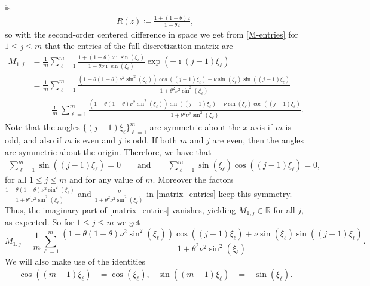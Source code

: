 \documentclass[smallextended,numbook,runningheads]{svjour3}     %
\begin{document}
is
\begin{align}\label{R}
    R(z)  \coloneqq \frac{1+(1-\theta)z}{1-\theta z},
\end{align}
so with the second-order centered difference in space we get from \eqref{M-entries} for $1\le j\le m$ that
the entries of the full discretization matrix are 
\begin{equation}\label{matrix_entries}
\begin{split}
	M_{1,j} &= \frac{1}{m} \sum_{\ell=1}^m \frac{1+(1-\theta)\nu \imath\sin(\xi_\ell)}
		{1-\theta\nu \imath\sin(\xi_\ell)}\exp\left(-\imath(j-1)\xi_\ell\right) \\
		&= \frac{1}{m} \sum_{\ell=1}^{m} \frac{\left(1-\theta(1-\theta)\nu^2\sin^2(\xi_\ell)\right)
		\cos((j-1)\xi_\ell) + \nu \sin(\xi_\ell)\sin((j-1)\xi_\ell)}{1+\theta^2\nu^2 \sin^2(\xi_\ell)} \\
		&\quad - \frac{\imath}{m} \sum_{\ell=1}^{m} \frac{\left(1-\theta(1-\theta)\nu^2\sin^2(\xi_\ell)
		\right)\sin((j-1)\xi_\ell) - \nu \sin(\xi_\ell)\cos((j-1)\xi_\ell)}
		{1+\theta^2\nu^2 \sin^2(\xi_\ell)}.
\end{split}
\end{equation}
Note that the angles $\{(j-1)\xi_\ell\}_{\ell=1}^m$ are symmetric about the $x$-axis if $m$ is odd, and
also if $m$ is even and $j$ is odd.
If both $m$ and $j$ are even, then the angles are symmetric about the origin.
Therefore, we have that
\begin{align*}
	\sum_{\ell=1}^{m} \sin((j-1)\xi_\ell) = 0 \qquad \text{and} \qquad
		\sum_{\ell=1}^{m} \sin(\xi_\ell)\cos((j-1)\xi_\ell) = 0,
\end{align*}
for all $1\le j\le m$  and for any value of $m$.
Moreover the factors
$\frac{1-\theta(1-\theta)\nu^2\sin^2(\xi_\ell)}{1+\theta^2\nu^2 \sin^2(\xi_\ell)}$
and $\frac{\nu}{1+\theta^2\nu^2 \sin^2(\xi_\ell)}$ in \eqref{matrix_entries} keep this symmetry.
Thus, the imaginary part of \eqref{matrix_entries} vanishes, yielding $M_{1,j}\in\mathbb{R}$ for all $j$,
as expected.
So for $1\le j\le m$ we get
\[
  M_{1,j}  = \frac{1}{m} \sum_{\ell=1}^{m} \frac{\left(1-\theta(1-\theta)\nu^2\sin^2(\xi_\ell)\right)
  \cos((j-1)\xi_\ell) + \nu \sin(\xi_\ell)\sin((j-1)\xi_\ell)}{1+\theta^2\nu^2 \sin^2(\xi_\ell)}.
\]
We will also make use of the identities
\begin{align} \label{angle-identities}
    \cos((m-1)\xi_\ell) & = \cos(\xi_\ell), & \sin((m-1)\xi_\ell) & = -\sin(\xi_\ell).
\end{align}
\end{document}
